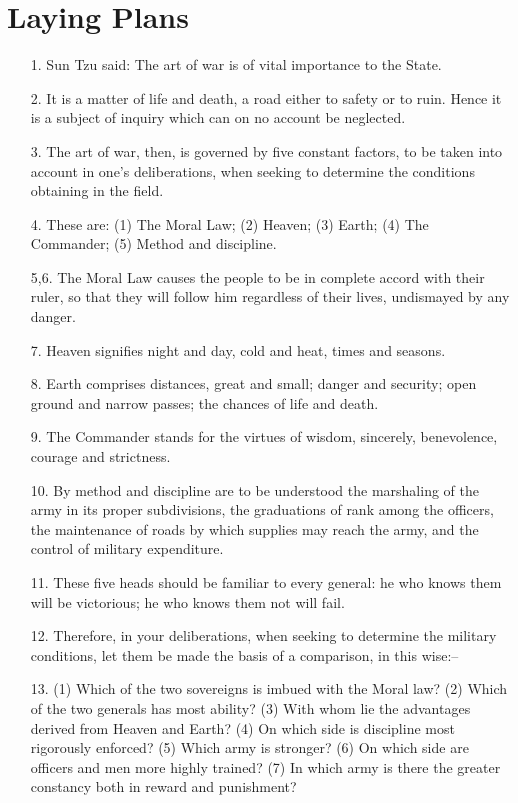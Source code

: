 \documentclass[11pt,openany]{memoir}
\newcommand{\enumeratemargin}{1.30em}
\begin{document}
\chapter{Laying Plans}
\begin{enumerate}[leftmargin=\enumeratemargin]
\item[1.] Sun Tzu said: The art of war is of vital importance to the State.
\item[2.] It is a matter of life and death, a road either to safety or to ruin. Hence it is a subject of inquiry which can on no account be neglected.
\item[3.] The art of war, then, is governed by five constant factors, to be taken into account in one's deliberations, when seeking to determine the conditions obtaining in the field.
\item[4.] These are: (1) The Moral Law; (2) Heaven; (3) Earth; (4) The Commander; (5) Method and discipline.
\item[5,6.] The Moral Law causes the people to be in complete accord with their ruler, so that they will follow him regardless of their lives, undismayed by any danger.
\item[7.] Heaven signifies night and day, cold and heat, times and seasons.
\item[8.] Earth comprises distances, great and small; danger and security; open ground and narrow passes; the chances of life and death.
\item[9.] The Commander stands for the virtues of wisdom, sincerely, benevolence, courage and strictness.
\item[10.] By method and discipline are to be understood the marshaling of the army in its proper subdivisions, the graduations of rank among the officers, the maintenance of roads by which supplies may reach the army, and the control of military expenditure.
\item[11.] These five heads should be familiar to every general: he who knows them will be victorious; he who knows them not will fail.
\item[12.] Therefore, in your deliberations, when seeking to determine the military conditions, let them be made the basis of a comparison, in this wise:--
\item[13.] (1) Which of the two sovereigns is imbued with the Moral law? (2) Which of the two generals has most ability? (3) With whom lie the advantages derived from Heaven and Earth? (4) On which side is discipline most rigorously enforced? (5) Which army is stronger? (6) On which side are officers and men more highly trained? (7) In which army is there the greater constancy both in reward and punishment?

\end{enumerate}
\end{document}
